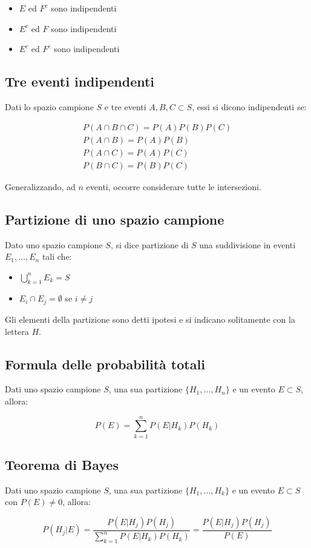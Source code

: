 \documentclass{article}
\begin{document}
\begin{itemize}
    \item $E$ ed $F^c$ sono indipendenti
    \item $E^c$ ed $F$ sono indipendenti
    \item $E^c$ ed $F^c$ sono indipendenti
\end{itemize}

\subsection{Tre eventi indipendenti}

Dati lo spazio campione $S$ e tre eventi $A,B,C \subset S$, essi si dicono indipendenti se:

$$
\begin{matrix}
P(A \cap B \cap C) = P(A)P(B)P(C) \\
P(A \cap B) = P(A)P(B) \\
P(A \cap C) = P(A)P(C) \\
P(B \cap C) = P(B)P(C)
\end{matrix}
$$

\noindent
Generalizzando, ad $n$ eventi, occorre considerare tutte le intersezioni.

\subsection{Partizione di uno spazio campione}

Dato uno spazio campione $S$, si dice partizione di $S$ una suddivisione in eventi $E_1, \dots, E_n$ tali che:

\begin{itemize}
    \item $\bigcup^n_{k=1} E_k = S$
    \item $E_i \cap E_j = \emptyset$ se $i \neq j$
\end{itemize}

Gli elementi della partizione sono detti ipotesi e si indicano solitamente con la lettera $H$.

\subsection{Formula delle probabilità totali}

Dati uno spazio campione $S$, una sua partizione $\{H_1, \dots, H_n\}$ e un evento $E \subset S$, allora:

$$
P(E) = \sum^n_{k=1} P(E|H_k)P(H_k)
$$

\subsection{Teorema di Bayes}

Dati uno spazio campione $S$, una sua partizione $\{H_1, \dots, H_k\}$ e un evento $E \subset S$ con $P(E) \neq 0$, allora:

$$
P(H_j|E) = \frac{P(E|H_j)P(H_j)}{\sum^n_{k=1} P(E|H_k)P(H_k)} = \frac{P(E|H_j)P(H_j)}{P(E)}
$$
\end{document}
